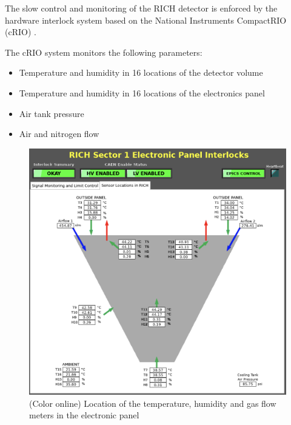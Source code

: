 \documentclass[5p,times,twocolumn]{elsarticle}
\begin{document}
The slow control and monitoring  of the RICH detector is enforced 
by the hardware interlock system based on the National Instruments CompactRIO (cRIO)  \cite{Ref:cRIO}.

The cRIO system monitors the following parameters:
\begin{itemize}
\item Temperature and humidity in 16 locations of the detector volume
\item Temperature and humidity in 16 locations of the electronics panel
\item Air tank pressure 
\item Air and nitrogen flow 
\end{itemize}
\begin{figure}
\begin{center}
\includegraphics[width=0.8\columnwidth]{RICH_sensors_e_panel.png}
\end{center}
\caption{(Color online) Location of the temperature, humidity and gas flow meters in the electronic panel}
\label{Fig:RICH_sensors_e_panel}
\end{figure}
\end{document}

